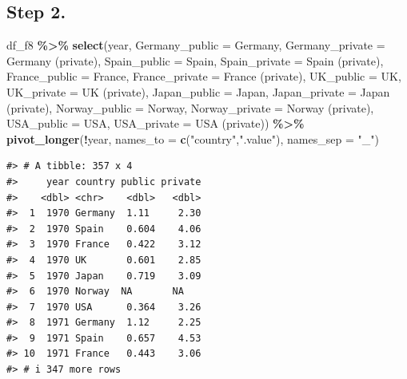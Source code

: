 \documentclass[
  xelatex, ja=standard]{bxjsbook}
\newenvironment{Shaded}{\begin{snugshade}}{\end{snugshade}}
\newcommand{\AttributeTok}[1]{\textcolor[rgb]{0.13,0.29,0.53}{#1}}
\newcommand{\FunctionTok}[1]{\textcolor[rgb]{0.13,0.29,0.53}{\textbf{#1}}}
\newcommand{\NormalTok}[1]{#1}
\newcommand{\SpecialCharTok}[1]{\textcolor[rgb]{0.81,0.36,0.00}{\textbf{#1}}}
\newcommand{\StringTok}[1]{\textcolor[rgb]{0.31,0.60,0.02}{#1}}
\theoremstyle{definition}
\theoremstyle{definition}
\theoremstyle{definition}
\theoremstyle{definition}
\theoremstyle{remark}
\begin{document}
\hypertarget{step-2.-2}{%
\subsection{Step 2.}\label{step-2.-2}}

\begin{Shaded}
\begin{Highlighting}[]
\NormalTok{df\_f8 }\SpecialCharTok{\%\textgreater{}\%} 
  \FunctionTok{select}\NormalTok{(year, }\AttributeTok{Germany\_public =}\NormalTok{ Germany, }\AttributeTok{Germany\_private =} \StringTok{\textquotesingle{}Germany (private)\textquotesingle{}}\NormalTok{, }
         \AttributeTok{Spain\_public =}\NormalTok{ Spain, }\AttributeTok{Spain\_private =} \StringTok{\textquotesingle{}Spain (private)\textquotesingle{}}\NormalTok{, }
         \AttributeTok{France\_public =}\NormalTok{ France, }\AttributeTok{France\_private =} \StringTok{\textquotesingle{}France (private)\textquotesingle{}}\NormalTok{, }
         \AttributeTok{UK\_public  =}\NormalTok{ UK, }\AttributeTok{UK\_private =} \StringTok{\textquotesingle{}UK (private)\textquotesingle{}}\NormalTok{, }
         \AttributeTok{Japan\_public =}\NormalTok{ Japan, }\AttributeTok{Japan\_private =} \StringTok{\textquotesingle{}Japan (private)\textquotesingle{}}\NormalTok{, }
         \AttributeTok{Norway\_public =}\NormalTok{ Norway, }\AttributeTok{Norway\_private =} \StringTok{\textquotesingle{}Norway (private)\textquotesingle{}}\NormalTok{,}
         \AttributeTok{USA\_public =}\NormalTok{ USA, }\AttributeTok{USA\_private =} \StringTok{\textquotesingle{}USA (private)\textquotesingle{}}\NormalTok{) }\SpecialCharTok{\%\textgreater{}\%}
  \FunctionTok{pivot\_longer}\NormalTok{(}\SpecialCharTok{!}\NormalTok{year, }\AttributeTok{names\_to =} \FunctionTok{c}\NormalTok{(}\StringTok{"country"}\NormalTok{,}\StringTok{".value"}\NormalTok{), }\AttributeTok{names\_sep =} \StringTok{"\_"}\NormalTok{) }
\end{Highlighting}
\end{Shaded}

\begin{verbatim}
#> # A tibble: 357 x 4
#>     year country public private
#>    <dbl> <chr>    <dbl>   <dbl>
#>  1  1970 Germany  1.11     2.30
#>  2  1970 Spain    0.604    4.06
#>  3  1970 France   0.422    3.12
#>  4  1970 UK       0.601    2.85
#>  5  1970 Japan    0.719    3.09
#>  6  1970 Norway  NA       NA   
#>  7  1970 USA      0.364    3.26
#>  8  1971 Germany  1.12     2.25
#>  9  1971 Spain    0.657    4.53
#> 10  1971 France   0.443    3.06
#> # i 347 more rows
\end{verbatim}
\end{document}
